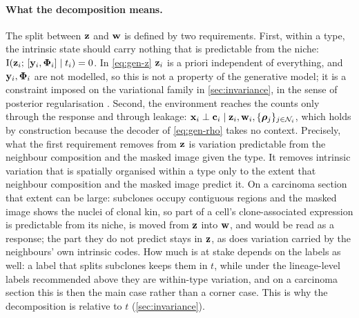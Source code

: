 \paragraph{What the decomposition means.}
 The split between $\mathbf{z}$ and $\mathbf{w}$ is defined by two requirements. First, within a type, the intrinsic state should carry nothing that is predictable from the niche: $\operatorname{I}(\mathbf{z}_i;\, [\mathbf{y}_i, \boldsymbol{\Phi}_i] \mid t_i) = 0$. In \cref{eq:gen-z} $\mathbf{z}_i$ is a priori independent of everything, and $\mathbf{y}_i, \boldsymbol{\Phi}_i$ are not modelled, so this is not a property of the generative model; it is a constraint imposed on the variational family in \cref{sec:invariance}, in the sense of posterior regularisation \citep{ganchev2010}. Second, the environment reaches the counts only through the response and through leakage: $\mathbf{x}_i \perp \mathbf{c}_i \mid \mathbf{z}_i, \mathbf{w}_i, \{\boldsymbol{\rho}_j\}_{j \in \mathcal{N}_{i}}$, which holds by construction because the decoder of \cref{eq:gen-rho} takes no context. Precisely, what the first requirement removes from $\mathbf{z}$ is variation predictable from the neighbour composition and the masked image given the type. It removes intrinsic variation that is spatially organised within a type only to the extent that neighbour composition and the masked image predict it. On a carcinoma section that extent can be large: subclones occupy contiguous regions and the masked image shows the nuclei of clonal kin, so part of a cell's clone-associated expression is predictable from its niche, is moved from $\mathbf{z}$ into $\mathbf{w}$, and would be read as a response; the part they do not predict stays in $\mathbf{z}$, as does variation carried by the neighbours' own intrinsic codes. How much is at stake depends on the labels as well: a label that splits subclones keeps them in $t$, while under the lineage-level labels recommended above they are within-type variation, and on a carcinoma section this is then the main case rather than a corner case. This is why the decomposition is relative to $t$ (\cref{sec:invariance}).

